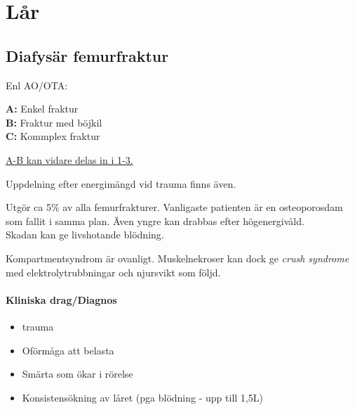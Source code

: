 \documentclass[
  letterpaper,
  DIV=11,
  numbers=noendperiod]{scrreport}
\let\oldparagraph\paragraph
\renewcommand{\paragraph}[1]{\oldparagraph{#1}\mbox{}}
\providecommand{\tightlist}{%
  \setlength{\itemsep}{0pt}\setlength{\parskip}{0pt}}\usepackage{longtable,booktabs,array}
\begin{document}
\hypertarget{luxe5r}{%
\section{Lår}\label{luxe5r}}

\hypertarget{diafysuxe4r-femurfraktur}{%
\subsection{Diafysär femurfraktur}\label{diafysuxe4r-femurfraktur}}

\begin{tcolorbox}[enhanced jigsaw, colback=white, colbacktitle=quarto-callout-tip-color!10!white, toptitle=1mm, arc=.35mm, toprule=.15mm, rightrule=.15mm, titlerule=0mm, breakable, bottomrule=.15mm, colframe=quarto-callout-tip-color-frame, left=2mm, opacityback=0, coltitle=black, title=\textcolor{quarto-callout-tip-color}{\faLightbulb}\hspace{0.5em}{Klassifikation}, leftrule=.75mm, bottomtitle=1mm, opacitybacktitle=0.6]

Enl AO/OTA:

\textbf{A:} Enkel fraktur\\
\textbf{B:} Fraktur med böjkil\\
\textbf{C:} Kommplex fraktur

\href{https://www.orthobullets.com/trauma/1040/femoral-shaft-fractures}{A-B
kan vidare delas in i 1-3.}

Uppdelning efter energimängd vid trauma finns även.

\end{tcolorbox}

Utgör ca 5\% av alla femurfrakturer. Vanligaste patienten är en
osteoporosdam som fallit i samma plan. Även yngre kan drabbas efter
högenergivåld.\\
Skadan kan ge livshotande blödning.

Kompartmentsyndrom är ovanligt. Muskelnekroser kan dock ge \emph{crush
syndrome} med elektrolytrubbningar och njursvikt som följd.

\hypertarget{kliniska-dragdiagnos-11}{%
\paragraph{Kliniska drag/Diagnos}\label{kliniska-dragdiagnos-11}}

\begin{itemize}
\tightlist
\item
  trauma
\item
  Oförmåga att belasta
\item
  Smärta som ökar i rörelse
\item
  Konsistensökning av låret (pga blödning - upp till 1,5L)
\end{itemize}
\end{document}
